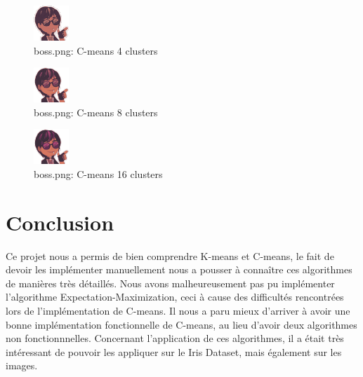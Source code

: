 \documentclass{article}
\begin{document}
  \begin{figure}
    \includegraphics[scale=2]{images/result_boss_c_4.png}
    \caption{boss.png: C-means 4 clusters}
    \label{fig:}
  \end{figure}

  \begin{figure}
    \includegraphics[scale=2]{images/result_boss_c_8.png}
    \caption{boss.png: C-means 8 clusters}
    \label{fig:}
  \end{figure}

  \begin{figure}
    \includegraphics[scale=2]{images/result_boss_c_16.png}
    \caption{boss.png: C-means 16 clusters}
    \label{fig:}
  \end{figure}
  \fi

  \section{Conclusion}

  Ce projet nous a permis de bien comprendre K-means et C-means, le fait de devoir les implémenter
  manuellement nous a pousser à connaître ces algorithmes de manières très détaillés.
  Nous avons malheureusement pas pu implémenter l'algorithme Expectation-Maximization,
  ceci à cause des difficultés rencontrées lors de l'implémentation de C-means.
  Il nous a paru mieux d'arriver à avoir une bonne implémentation fonctionnelle de C-means,
  au lieu d'avoir deux algorithmes non fonctionnnelles.
  Concernant l'application de ces algorithmes,
  il a était très intéressant de pouvoir les appliquer sur le Iris Dataset, mais également sur les images.


\nocite{*}
\end{document}
